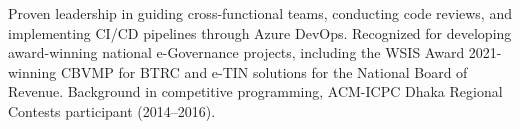 ﻿\documentclass[letterpaper,10pt]{article}
\newcommand{\resumeItem}[1]{\item\small{#1}}
\newcommand{\resumeSubHeadingList}{\begin{itemize}[leftmargin=0.15in, label={}]}
\newcommand{\resumeSubHeadingListEnd}{\end{itemize}}
\begin{document}
Proven leadership in guiding cross-functional teams, conducting code reviews, and implementing CI/CD pipelines through Azure DevOps. Recognized for developing award-winning national e-Governance projects, including the WSIS Award 2021-winning CBVMP for BTRC and e-TIN solutions for the National Board of Revenue. Background in competitive programming, ACM-ICPC Dhaka Regional Contests participant (2014--2016).

\end{document}
